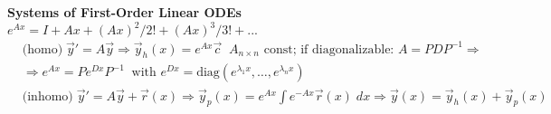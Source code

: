 \textbf{Systems of First-Order Linear ODEs} \; \;$ e^{Ax} = I + Ax + (Ax)^2/2!+(Ax)^3/3!+...$
\begin{align*}
&\text{(homo)} \; \vec{y}' = A\vec{y} \Rightarrow \vec{y}_h(x) = e^{Ax} \vec{c} \;\; A_{n\times n}\text{ const; if diagonalizable: } A = PDP^{-1} \Rightarrow\\
&\Rightarrow e^{Ax} = P e^{Dx} P^{-1} \;\; \text{with } e^{Dx} = \text{diag}(e^{\lambda_1 x}, \dots, e^{\lambda_n x})\\
&\text{(inhomo)} \; \vec{y}' = A\vec{y} + \vec{r}(x) \Rightarrow \vec{y}_p(x) = e^{Ax} \int e^{-Ax} \vec{r}(x)\;\! dx \Rightarrow \vec{y}(x) = \vec{y}_h(x) + \vec{y}_p(x)
\end{align*}